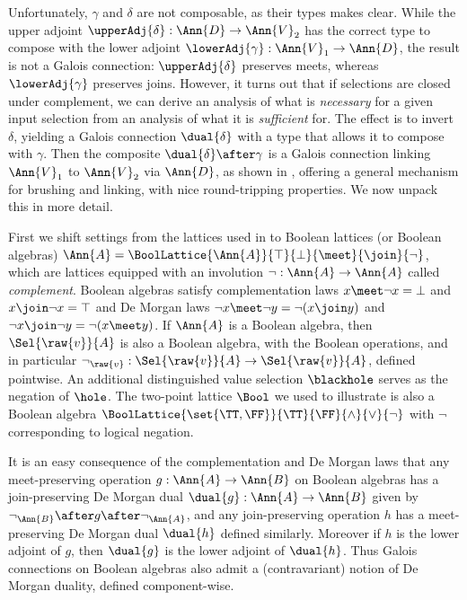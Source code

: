 

\noindent Unfortunately, $\gamma$ and $\delta$ are not composable, as their types makes clear. While the upper adjoint $\upperAdj{\delta}: \Ann{D} \to \Ann{V}_2$ has the correct type to compose with the lower adjoint $\lowerAdj{\gamma}: \Ann{V}_1 \to \Ann{D}$, the result is not a Galois connection: $\upperAdj{\delta}$ preserves meets, whereas $\lowerAdj{\gamma}$ preserves joins. However, it turns out that if selections are closed under complement, we can derive an analysis of what is \emph{necessary} for a given input selection from an analysis of what it is \emph{sufficient} for. The effect is to invert $\delta$, yielding a Galois connection $\dual{\delta}$ with a type that allows it to compose with $\gamma$. Then the composite $\dual{\delta} \after \gamma$ is a Galois connection linking $\Ann{V}_1$ to $\Ann{V}_2$ via $\Ann{D}$, as shown in , offering a general mechanism for brushing and linking, with nice round-tripping properties. We now unpack this in more detail.

First we shift settings from the lattices used in  to Boolean lattices (or Boolean algebras) $\Ann{A}= \BoolLattice{\Ann{A}}{\top}{\bot}{\meet}{\join}{\neg}$, which are lattices equipped with an involution $\neg: \Ann{A} \to \Ann{A}$ called \emph{complement}. Boolean algebras satisfy complementation laws $x \meet \neg x = \bot$ and $x \join \neg x = \top$ and De Morgan laws $\neg x \meet \neg y = \neg(x \join y)$ and $\neg x \join \neg y = \neg(x \meet y)$. If $\Ann{A}$ is a Boolean algebra, then $\Sel{\raw{v}}{A}$ is also a Boolean algebra, with the Boolean operations, and in particular $\neg_{\raw{v}}: \Sel{\raw{v}}{A} \to \Sel{\raw{v}}{A}$, defined pointwise. An additional distinguished value selection $\blackhole$ serves as the negation of $\hole$. The two-point lattice $\Bool$ we used to illustrate  is also a Boolean algebra $\BoolLattice{\set{\TT,\FF}}{\TT}{\FF}{\wedge}{\vee}{\neg}$ with $\neg$ corresponding to logical negation.



It is an easy consequence of the complementation and De Morgan laws that any meet-preserving operation $g: \Ann{A} \to \Ann{B}$ on Boolean algebras has a join-preserving De Morgan dual $\dual{g}: \Ann{A} \to \Ann{B}$ given by $\neg_{\Ann{B}} \after g\after \neg_{\Ann{A}}$, and any join-preserving operation $h$ has a meet-preserving De Morgan dual $\dual{h}$ defined similarly. Moreover if $h$ is the lower adjoint of $g$, then $\dual{g}$ is the lower adjoint of $\dual{h}$. Thus Galois connections on Boolean algebras also admit a (contravariant) notion of De Morgan duality, defined component-wise.

